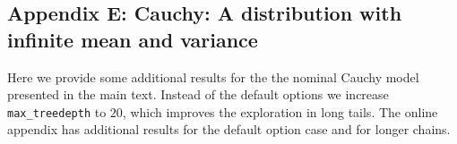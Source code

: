 \documentclass[american,]{article}
\let\oldparagraph\paragraph
\renewcommand{\paragraph}[1]{\oldparagraph{#1}\mbox{}}
\begin{document}
\hypertarget{AppendixE}{%
\subsection*{Appendix E: Cauchy: A distribution with infinite mean and
variance}\label{AppendixE}}

Here we provide some additional results for the the nominal Cauchy
model presented in the main text. Instead of the default options we
increase \texttt{max\_treedepth} to \(20\), which improves the
exploration in long tails. The online appendix has additional results
for the default option case and for longer chains.









\end{document}
